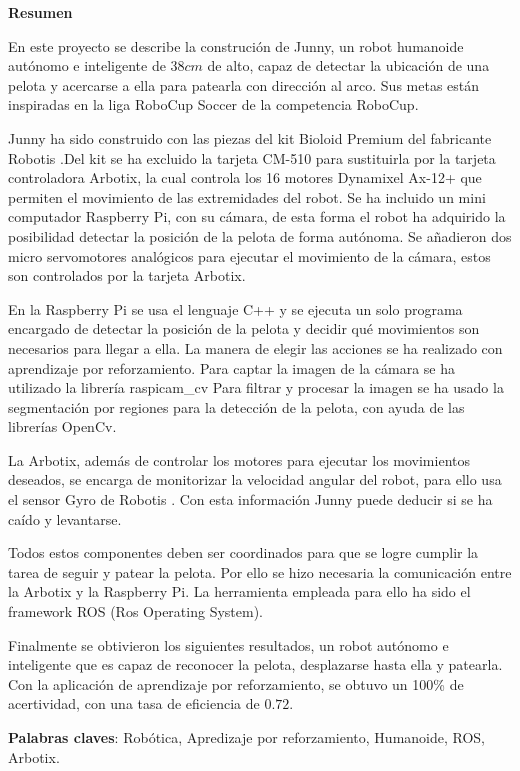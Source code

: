 \setcounter{page}{4}
\begin{center}
	{\bf Resumen}  %
\end{center}	


En este proyecto se describe la construción de Junny, un robot humanoide autónomo e inteligente de $38 cm $ de alto, capaz de detectar la ubicación de una pelota y acercarse a ella para patearla con dirección al arco. Sus metas están inspiradas en la liga RoboCup Soccer de la competencia RoboCup.

Junny ha sido construido con las piezas del kit Bioloid Premium del fabricante Robotis %
.Del kit se ha excluido la tarjeta CM-510 para sustituirla por la tarjeta controladora Arbotix, la cual controla los 16 motores Dynamixel Ax-12+ que permiten el movimiento de las extremidades del robot. Se ha incluido un mini computador Raspberry Pi, con su cámara, %
de esta forma el robot ha adquirido la posibilidad detectar la posición de la pelota de forma autónoma. Se añadieron dos micro servomotores analógicos para ejecutar el movimiento de la c\'amara, estos son controlados por la tarjeta Arbotix. 

En la Raspberry Pi se usa el lenguaje C++ y se ejecuta un solo programa encargado de detectar la posición de la pelota y decidir qué movimientos son necesarios para llegar a ella. La manera de elegir las acciones se ha realizado con aprendizaje por reforzamiento. Para captar la imagen de la cámara se ha utilizado la librería raspicam\_cv %
 Para filtrar y procesar la imagen se ha usado la segmentaci\'on por regiones para la detecci\'on de la pelota, con ayuda de las librerías OpenCv. %

La Arbotix, además de controlar los motores para ejecutar los movimientos deseados, se encarga de monitorizar la velocidad angular del robot, para ello usa el sensor Gyro de Robotis %
. Con esta información Junny puede deducir si se ha caído y levantarse. 

Todos estos componentes deben ser coordinados para que se logre cumplir la tarea de seguir y patear la pelota. Por ello se hizo necesaria la comunicación entre la Arbotix y la Raspberry Pi. La herramienta 
empleada para ello ha sido el \gls{framework} ROS (Ros Operating System). %

Finalmente se obtivieron los siguientes resultados, un robot aut\'onomo e inteligente que es capaz de reconocer la pelota, desplazarse hasta ella y patearla. Con la aplicaci\'on de aprendizaje por reforzamiento, se obtuvo un 100\% de acertividad, con una tasa de eficiencia de $0.72$.

\textbf{Palabras claves}: Rob\'otica, Apredizaje por reforzamiento, Humanoide, ROS, Arbotix.


